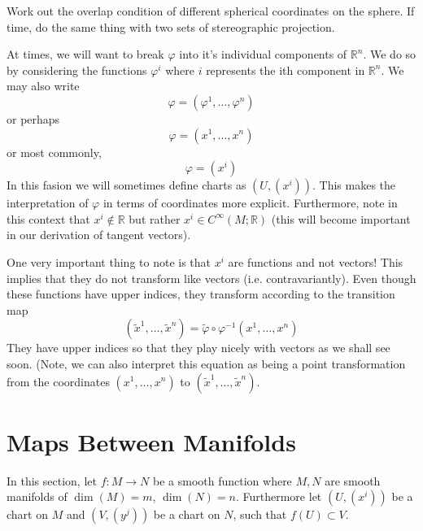 \documentclass[a4paper]{article}
\begin{document}
Work out the overlap condition of different spherical coordinates on the sphere. If time, do the same thing with two sets of stereographic projection.

At times, we will want to break $\varphi$ into it's individual components of $\mathds{R}^n$. We do so by considering the functions $\varphi^i$ where $i$ represents the ith component in $\mathds{R}^n$. We may also write
\[
  \varphi = (\varphi^1, \dots, \varphi^n)
\]
or perhaps
\[
  \varphi = (x^1, \dots, x^n)
\]
or most commonly,
\[
  \varphi = (x^i)
\]
In this fasion we will sometimes define charts as $(U, (x^i))$. This makes the interpretation of $\varphi$ in terms of coordinates more explicit. Furthermore, note in this context that $x^i \not\in \mathds{R}$ but rather $x^i \in C^\infty(M; \mathds{R})$ (this will become important in our derivation of tangent vectors).

One very important thing to note is that $x^i$ are functions and not vectors! This implies that they do not transform like vectors (i.e. contravariantly). Even though these functions have upper indices, they transform according to the transition map
\[
  (\tilde{x}^1, \dots, \tilde{x}^n) = \tilde{\varphi} \circ \varphi^{-1} (x^1, \dots, x^n)
\]
They have upper indices so that they play nicely with vectors as we shall see soon. (Note, we can also interpret this equation as being a point transformation from the coordinates $(x^1, \dots, x^n)$ to $(\tilde{x}^1, \dots, \tilde{x}^n)$.

\section*{Maps Between Manifolds}%
In this section, let $f: M \rightarrow N$ be a smooth function where $M,N$ are smooth manifolds of $\dim(M) = m$, $\dim(N)= n$. Furthermore let $(U, (x^i))$ be a chart on $M$ and $(V, (y^j))$ be a chart on $N$, such that $f(U) \subset V$. 
\end{document}

